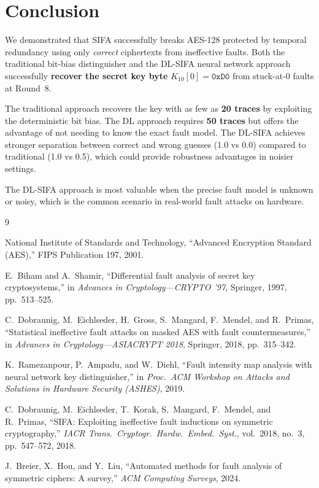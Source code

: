 \documentclass[11pt,a4paper]{article}
\begin{document}
\section{Conclusion}

We demonstrated that SIFA successfully breaks AES-128 protected by temporal redundancy using only \emph{correct} ciphertexts from ineffective faults. Both the traditional bit-bias distinguisher and the DL-SIFA neural network approach successfully \textbf{recover the secret key byte} $K_{10}[0] = \texttt{0xD0}$ from stuck-at-0 faults at Round~8.

The traditional approach recovers the key with as few as \textbf{20 traces} by exploiting the deterministic bit bias. The DL approach requires \textbf{50 traces} but offers the advantage of not needing to know the exact fault model. The DL-SIFA achieves stronger separation between correct and wrong guesses (1.0 vs 0.0) compared to traditional (1.0 vs 0.5), which could provide robustness advantages in noisier settings.

The DL-SIFA approach is most valuable when the precise fault model is unknown or noisy, which is the common scenario in real-world fault attacks on hardware.

\begin{thebibliography}{9}

National Institute of Standards and Technology, ``Advanced Encryption Standard (AES),'' FIPS Publication 197, 2001.

E.~Biham and A.~Shamir, ``Differential fault analysis of secret key cryptosystems,'' in \emph{Advances in Cryptology---CRYPTO '97}, Springer, 1997, pp.~513--525.

C.~Dobraunig, M.~Eichlseder, H.~Gross, S.~Mangard, F.~Mendel, and R.~Primas, ``Statistical ineffective fault attacks on masked AES with fault countermeasures,'' in \emph{Advances in Cryptology---ASIACRYPT 2018}, Springer, 2018, pp.~315--342.

K.~Ramezanpour, P.~Ampadu, and W.~Diehl, ``Fault intensity map analysis with neural network key distinguisher,'' in \emph{Proc.\ ACM Workshop on Attacks and Solutions in Hardware Security (ASHES)}, 2019.

C.~Dobraunig, M.~Eichlseder, T.~Korak, S.~Mangard, F.~Mendel, and R.~Primas, ``SIFA: Exploiting ineffective fault inductions on symmetric cryptography,'' \emph{IACR Trans.\ Cryptogr.\ Hardw.\ Embed.\ Syst.}, vol.~2018, no.~3, pp.~547--572, 2018.

J.~Breier, X.~Hou, and Y.~Liu, ``Automated methods for fault analysis of symmetric ciphers: A survey,'' \emph{ACM Computing Surveys}, 2024.

\end{thebibliography}
\end{document}
